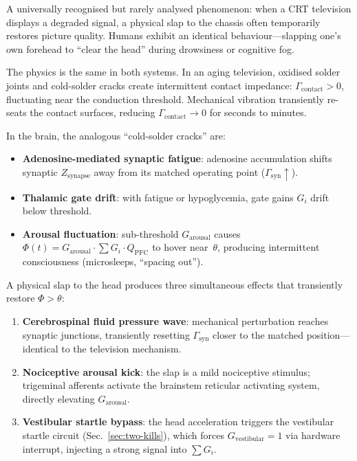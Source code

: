 \documentclass[aps,pre,twocolumn,superscriptaddress,floatfix]{revtex4-2}
\begin{document}
A universally recognised but rarely analysed phenomenon:
when a CRT television displays a degraded signal, a
physical slap to the chassis often temporarily restores
picture quality.
Humans exhibit an identical behaviour---slapping one's
own forehead to ``clear the head'' during drowsiness or
cognitive fog.

The physics is the same in both systems.
In an aging television, oxidised solder joints and
cold-solder cracks create intermittent contact impedance:
$\Gamma_{\text{contact}}>0$, fluctuating near the
conduction threshold.
Mechanical vibration transiently re-seats the contact
surfaces, reducing $\Gamma_{\text{contact}}\to 0$ for
seconds to minutes.

In the brain, the analogous ``cold-solder cracks'' are:
\begin{itemize}
  \item \textbf{Adenosine-mediated synaptic fatigue}:
    adenosine accumulation shifts synaptic
    $Z_{\text{synapse}}$ away from its matched
    operating point ($\Gamma_{\text{syn}}\uparrow$).
  \item \textbf{Thalamic gate drift}: with fatigue or
    hypoglycemia, gate gains $G_i$ drift below threshold.
  \item \textbf{Arousal fluctuation}: sub-threshold
    $G_{\text{arousal}}$ causes
    $\Phi(t)=G_{\text{arousal}}\cdot\sum G_i\cdot Q_{\text{PFC}}$
    to hover near~$\theta$, producing intermittent
    consciousness (microsleeps, ``spacing out'').
\end{itemize}

A physical slap to the head produces three simultaneous
effects that transiently restore $\Phi>\theta$:
\begin{enumerate}
  \item \textbf{Cerebrospinal fluid pressure wave}:
    mechanical perturbation reaches synaptic junctions,
    transiently resetting $\Gamma_{\text{syn}}$ closer
    to the matched position---identical to the television
    mechanism.
  \item \textbf{Nociceptive arousal kick}:
    the slap is a mild nociceptive stimulus;
    trigeminal afferents activate the brainstem
    reticular activating system, directly elevating
    $G_{\text{arousal}}$.
  \item \textbf{Vestibular startle bypass}:
    the head acceleration triggers the vestibular
    startle circuit (Sec.~\ref{sec:two-kills}),
    which forces $G_{\text{vestibular}}=1$ via
    hardware interrupt, injecting a strong signal
    into $\sum G_i$.
\end{enumerate}
\end{document}
